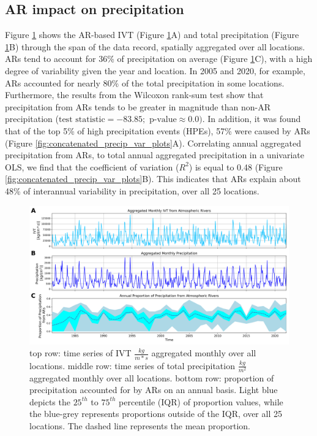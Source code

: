 \documentclass[12pts,draft]{AR_analysis_}
\begin{document}
\subsection{AR impact on precipitation}

Figure \ref{fig:IVT_Precip_proportion_over_time} shows the AR-based IVT 
(Figure \ref{fig:IVT_Precip_proportion_over_time}A) and total precipitation 
(Figure \ref{fig:IVT_Precip_proportion_over_time}B) through the span of the 
data record,
spatially aggregated over all locations. ARs tend to account for 36\% of
precipitation on average (Figure \ref{fig:IVT_Precip_proportion_over_time}C), 
with a high degree of variability given
the year and location. In 2005 and 2020, for example, ARs accounted for nearly 
80\% of the total precipitation in some locations. Furthermore, the results 
from the Wilcoxon rank-sum test show that
precipitation from ARs tends to be greater in magnitude than non-AR 
precipitation
($\text{test statistic} = -83.85; \text{ p-value} \approx 0.0)$. In addition, it
was found that of the top 5\% of high precipitation events (HPEs), 57\% were
caused by ARs (Figure \ref{fig:concatenated_precip_var_plots}A).
Correlating annual aggregated precipitation from ARs, to total annual
aggregated precipitation in a univariate OLS, we find that the
coefficient of variation ($R^{2}$) is equal to 0.48 (Figure 
\ref{fig:concatenated_precip_var_plots}B). This indicates that ARs
explain about 48\% of interannual variability in precipitation, 
over all 25 locations.  

\begin{figure}
\centering
\includegraphics[width=1.0\textwidth]{./images/IVT_Precip_proportion_over_time.png}
\caption{top row: time series of IVT $\frac{kg}{m*s}$ aggregated monthly 
	over all locations.
	middle row: time series of total precipitation $\frac{kg}{m^{2}}$ 
	aggregated monthly over all
	locations. bottom row: proportion of precipitation accounted for by
	ARs on an annual basis. Light blue depicts the $25^{th}$ to $75^{th}$
	percentile (IQR) of proportion values, while the blue-grey represents 
	proportions outside of the IQR, over all 25 locations. The dashed line 
	represents the mean proportion.}
\label{fig:IVT_Precip_proportion_over_time}
\end{figure}
\end{document}
